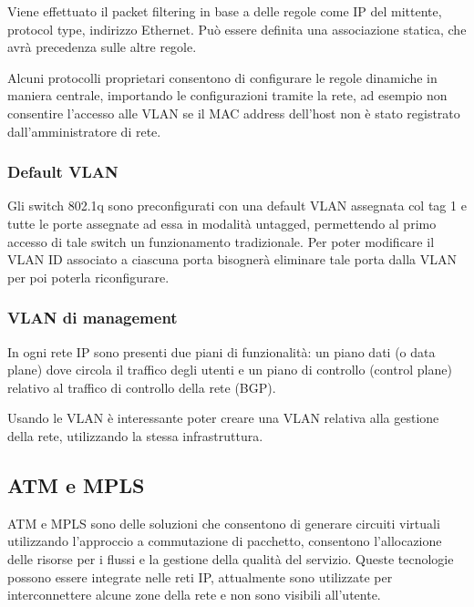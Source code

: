 \documentclass[
]{article}
\begin{document}
Viene effettuato il packet filtering in base a delle regole come IP del
mittente, protocol type, indirizzo Ethernet. Può essere definita una
associazione statica, che avrà precedenza sulle altre regole.

Alcuni protocolli proprietari consentono di configurare le regole
dinamiche in maniera centrale, importando le configurazioni tramite la
rete, ad esempio non consentire l'accesso alle VLAN se il MAC address
dell'host non è stato registrato dall'amministratore di rete.

\hypertarget{header-n357}{%
\subsubsection{Default VLAN}\label{header-n357}}

Gli switch 802.1q sono preconfigurati con una default VLAN assegnata col
tag 1 e tutte le porte assegnate ad essa in modalità untagged,
permettendo al primo accesso di tale switch un funzionamento
tradizionale. Per poter modificare il VLAN ID associato a ciascuna porta
bisognerà eliminare tale porta dalla VLAN per poi poterla riconfigurare.

\hypertarget{header-n359}{%
\subsubsection{VLAN di management}\label{header-n359}}

In ogni rete IP sono presenti due piani di funzionalità: un piano dati
(o data plane) dove circola il traffico degli utenti e un piano di
controllo (control plane) relativo al traffico di controllo della rete
(BGP).

Usando le VLAN è interessante poter creare una VLAN relativa alla
gestione della rete, utilizzando la stessa infrastruttura.

\hypertarget{header-n362}{%
\subsection{ATM e MPLS}\label{header-n362}}

ATM e MPLS sono delle soluzioni che consentono di generare circuiti
virtuali utilizzando l'approccio a commutazione di pacchetto, consentono
l'allocazione delle risorse per i flussi e la gestione della qualità del
servizio. Queste tecnologie possono essere integrate nelle reti IP,
attualmente sono utilizzate per interconnettere alcune zone della rete e
non sono visibili all'utente.
\end{document}
